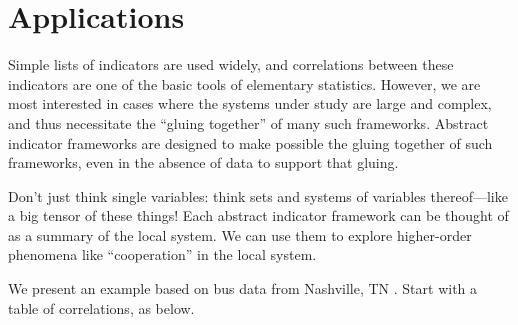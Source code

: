 \documentclass{article}
\theoremstyle{definition}
\newcommand{\redout}[1]{{\color{red}#1}}
\newcommand{\Cat}[1]{\mathsf{#1}}
\def\Ind{\Cat{Ind}}
\begin{document}




\section{Applications}
Simple lists of indicators are used widely, and correlations between these indicators are one of the basic tools of elementary statistics. However, we are most interested in cases where the systems under study are large and complex, and thus necessitate the ``gluing together'' of many such frameworks. Abstract indicator frameworks are designed to make possible the gluing together of such frameworks, even in the absence of data to support that gluing.

\redout{Don't just think single variables: think sets and systems of variables thereof---like a big tensor of these things! Each abstract indicator framework can be thought of as a summary of the local system. We can use them to explore higher-order phenomena like ``cooperation'' in the local system.}

We present an example based on bus data from Nashville, TN \cite{abhishek16}. Start with a table of correlations, as below.
\end{document}
